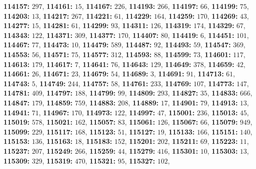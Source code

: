 \textsf{\bfseries 114157:} $297$, \textsf{\bfseries 114161:} $15$, \textsf{\bfseries 114167:} $226$, \textsf{\bfseries 114193:} $266$, \textsf{\bfseries 114197:} $66$, \textsf{\bfseries 114199:} $75$, \textsf{\bfseries 114203:} $13$, \textsf{\bfseries 114217:} $267$, \textsf{\bfseries 114221:} $61$, \textsf{\bfseries 114229:} $164$, \textsf{\bfseries 114259:} $170$, \textsf{\bfseries 114269:} $43$, \textsf{\bfseries 114277:} $15$, \textsf{\bfseries 114281:} $61$, \textsf{\bfseries 114299:} $93$, \textsf{\bfseries 114311:} $126$, \textsf{\bfseries 114319:} $174$, \textsf{\bfseries 114329:} $67$, \textsf{\bfseries 114343:} $122$, \textsf{\bfseries 114371:} $309$, \textsf{\bfseries 114377:} $170$, \textsf{\bfseries 114407:} $80$, \textsf{\bfseries 114419:} $6$, \textsf{\bfseries 114451:} $101$, \textsf{\bfseries 114467:} $77$, \textsf{\bfseries 114473:} $10$, \textsf{\bfseries 114479:} $589$, \textsf{\bfseries 114487:} $92$, \textsf{\bfseries 114493:} $59$, \textsf{\bfseries 114547:} $369$, \textsf{\bfseries 114553:} $56$, \textsf{\bfseries 114571:} $75$, \textsf{\bfseries 114577:} $312$, \textsf{\bfseries 114593:} $88$, \textsf{\bfseries 114599:} $73$, \textsf{\bfseries 114601:} $117$, \textsf{\bfseries 114613:} $179$, \textsf{\bfseries 114617:} $7$, \textsf{\bfseries 114641:} $76$, \textsf{\bfseries 114643:} $129$, \textsf{\bfseries 114649:} $378$, \textsf{\bfseries 114659:} $42$, \textsf{\bfseries 114661:} $26$, \textsf{\bfseries 114671:} $23$, \textsf{\bfseries 114679:} $54$, \textsf{\bfseries 114689:} $3$, \textsf{\bfseries 114691:} $91$, \textsf{\bfseries 114713:} $61$, \textsf{\bfseries 114743:} $5$, \textsf{\bfseries 114749:} $244$, \textsf{\bfseries 114757:} $58$, \textsf{\bfseries 114761:} $233$, \textsf{\bfseries 114769:} $107$, \textsf{\bfseries 114773:} $147$, \textsf{\bfseries 114781:} $409$, \textsf{\bfseries 114797:} $188$, \textsf{\bfseries 114799:} $99$, \textsf{\bfseries 114809:} $293$, \textsf{\bfseries 114827:} $35$, \textsf{\bfseries 114833:} $666$, \textsf{\bfseries 114847:} $179$, \textsf{\bfseries 114859:} $759$, \textsf{\bfseries 114883:} $208$, \textsf{\bfseries 114889:} $17$, \textsf{\bfseries 114901:} $79$, \textsf{\bfseries 114913:} $13$, \textsf{\bfseries 114941:} $71$, \textsf{\bfseries 114967:} $170$, \textsf{\bfseries 114973:} $122$, \textsf{\bfseries 114997:} $47$, \textsf{\bfseries 115001:} $236$, \textsf{\bfseries 115013:} $45$, \textsf{\bfseries 115019:} $578$, \textsf{\bfseries 115021:} $162$, \textsf{\bfseries 115057:} $83$, \textsf{\bfseries 115061:} $126$, \textsf{\bfseries 115067:} $66$, \textsf{\bfseries 115079:} $949$, \textsf{\bfseries 115099:} $229$, \textsf{\bfseries 115117:} $168$, \textsf{\bfseries 115123:} $51$, \textsf{\bfseries 115127:} $19$, \textsf{\bfseries 115133:} $166$, \textsf{\bfseries 115151:} $140$, \textsf{\bfseries 115153:} $136$, \textsf{\bfseries 115163:} $18$, \textsf{\bfseries 115183:} $152$, \textsf{\bfseries 115201:} $202$, \textsf{\bfseries 115211:} $69$, \textsf{\bfseries 115223:} $11$, \textsf{\bfseries 115237:} $207$, \textsf{\bfseries 115249:} $266$, \textsf{\bfseries 115259:} $44$, \textsf{\bfseries 115279:} $416$, \textsf{\bfseries 115301:} $10$, \textsf{\bfseries 115303:} $13$, \textsf{\bfseries 115309:} $329$, \textsf{\bfseries 115319:} $470$, \textsf{\bfseries 115321:} $95$, \textsf{\bfseries 115327:} $102$, 

